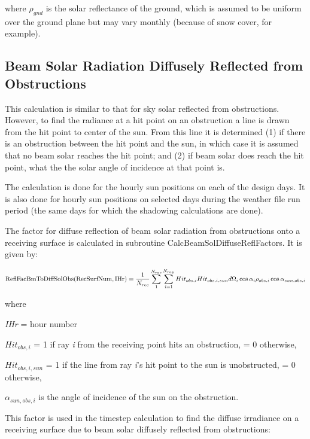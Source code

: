where \({\rho_{gnd}}\) is the solar reflectance of the ground, which is assumed to be uniform over the ground plane but may vary monthly (because of snow cover, for example).

\subsection{Beam Solar Radiation Diffusely Reflected from Obstructions}\label{beam-solar-radiation-diffusely-reflected-from-obstructions}

This calculation is similar to that for sky solar reflected from obstructions. However, to find the radiance at a hit point on an obstruction a line is drawn from the hit point to center of the sun. From this line it is determined (1) if there is an obstruction between the hit point and the sun, in which case it is assumed that no beam solar reaches the hit point; and (2) if beam solar does reach the hit point, what the the solar angle of incidence at that point is.

The calculation is done for the hourly sun positions on each of the design days. It is also done for hourly sun positions on selected days during the weather file run period (the same days for which the shadowing calculations are done).

The factor for diffuse reflection of beam solar radiation from obstructions onto a receiving surface is calculated in subroutine CalcBeamSolDiffuseReflFactors. It is given by:

{\scriptsize
\begin{equation}
{\rm{ReflFacBmToDiffSolObs(RecSurfNum,IHr)}} = \frac{1}{{{N_{rec}}}}\sum\limits_1^{{N_{rec}}} {\sum\limits_{i = 1}^{{N_{ray}}} {Hi{t_{obs,i}}Hi{t_{obs,i,sun}}d{\Omega_i}\cos {\alpha_i}{\rho_{obs,i}}\cos {\alpha_{sun,obs,i}}} }
\end{equation}}

where

\emph{IHr} = hour number

\(Hi{t_{obs,i}}\) = 1 if ray \emph{i} from the receiving point hits an obstruction, = 0 otherwise,

\(Hi{t_{obs,i,sun}}\) = 1 if the line from ray \emph{i}'s hit point to the sun is unobstructed, = 0 otherwise,

\({\alpha_{sun,obs,i}}\) is the angle of incidence of the sun on the obstruction.

This factor is used in the timestep calculation to find the diffuse irradiance on a receiving surface due to beam solar diffusely reflected from obstructions:

